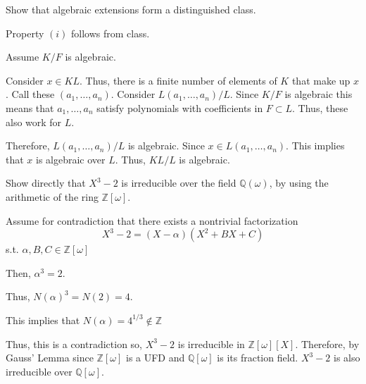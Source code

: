 \documentclass[12pt, letterpaper]{article}
\newcommand{\Q}{\mathbb{Q}}
\newcommand{\Z}{\mathbb{Z}}
\begin{document}
\begin{subproblem}{}
    Show that algebraic extensions form a distinguished class.
\end{subproblem}
\begin{problemproof}
    Property $(i)$ follows from class.

    Assume $K/F$ is algebraic.

    Consider $x \in KL$. Thus, there is a finite number of elements of $K$ that make up $x$. Call these $(a_1,\dots,a_n)$. Consider $L(a_1,\dots,a_n)/L$. Since $K/F$ is algebraic this means that $a_1,\dots,a_n$ satisfy polynomials with coefficients in $F \subset L$. Thus, these also work for $L$.

    Therefore, $L(a_1,\dots,a_n)/L$ is algebraic. Since $x \in L(a_1,\dots,a_n)$. This implies that $x$ is algebraic over $L$. Thus, $KL/L$ is algebraic.
\end{problemproof}

\qh
\begin{subproblem}{}
    Show directly that $X^3-2$ is irreducible over the field $\Q(\omega)
$, by using the arithmetic of the ring $\Z[\omega]$.
\end{subproblem}
\begin{problemproof}
    Assume for contradiction that there exists a nontrivial factorization
    \[X^3-2=(X-\alpha)(X^2+BX+C)\]
    s.t. $\alpha,B,C \in \Z[\omega]$

    Then, $\alpha^3=2$.

    Thus, $N(\alpha)^3=N(2)=4$.

    This implies that $N(\alpha)=4^{1/3} \notin \Z$

    Thus, this is a contradiction so, $X^3-2$ is irreducible in $\Z[\omega][X]$. Therefore, by Gauss' Lemma since $\Z[\omega]$ is a UFD and $\Q[\omega]$ is its fraction field. $X^3-2$ is also irreducible over $\Q[\omega]$.
\end{problemproof}
\end{document}
